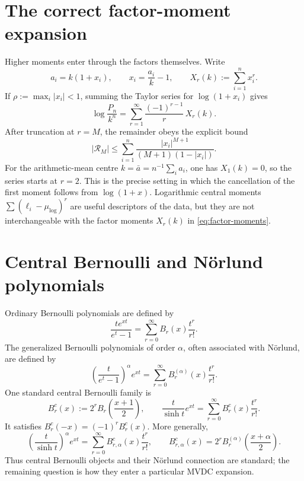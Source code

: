 \documentclass[11pt,a4paper]{article}
\begin{document}
\section{The correct factor-moment expansion}

Higher moments enter through the factors themselves.  Write
\[
  a_i=k(1+x_i),\qquad x_i=\frac{a_i}{k}-1,
  \qquad X_r(k):=\sum_{i=1}^{n}x_i^r .
\]
If \(\rho:=\max_i|x_i|<1\), summing the Taylor series for
\(\log(1+x_i)\) gives
\begin{equation}\label{eq:factor-moments}
  \boxed{\;
  \log\frac{P_n}{k^n}
  =\sum_{r=1}^{\infty}\frac{(-1)^{r-1}}{r}\,X_r(k).\;}
\end{equation}
After truncation at \(r=M\), the remainder obeys the explicit bound
\[
  |\mathcal R_M|
  \le
  \sum_{i=1}^{n}
  \frac{|x_i|^{M+1}}{(M+1)(1-|x_i|)}.
\]
For the arithmetic-mean centre
\(k=\bar a=n^{-1}\sum_i a_i\), one has \(X_1(k)=0\), so the series starts
at \(r=2\).  This is the precise setting in which the cancellation of
the first moment follows from \(\log(1+x)\).  Logarithmic central
moments \(\sum(\ell_i-\mu_{\log})^r\) are useful descriptors of the
data, but they are not interchangeable with the factor moments
\(X_r(k)\) in \eqref{eq:factor-moments}.

\section{Central Bernoulli and Nörlund polynomials}

Ordinary Bernoulli polynomials are defined by
\[
  \frac{t e^{xt}}{e^t-1}
  =\sum_{r=0}^{\infty}B_r(x)\frac{t^r}{r!}.
\]
The generalized Bernoulli polynomials of order \(\alpha\), often
associated with Nörlund, are defined by
\begin{equation}\label{eq:norlund}
  \left(\frac{t}{e^t-1}\right)^\alpha e^{xt}
  =\sum_{r=0}^{\infty}B_r^{(\alpha)}(x)\frac{t^r}{r!}.
\end{equation}
One standard central Bernoulli family is
\begin{equation}\label{eq:central-bernoulli}
  B_r^c(x):=2^rB_r\!\left(\frac{x+1}{2}\right),
  \qquad
  \frac{t}{\sinh t}e^{xt}
  =\sum_{r=0}^{\infty}B_r^c(x)\frac{t^r}{r!}.
\end{equation}
It satisfies \(B_r^c(-x)=(-1)^rB_r^c(x)\).  More generally,
\[
  \left(\frac{t}{\sinh t}\right)^\alpha e^{xt}
  =\sum_{r=0}^{\infty}B_{r,\alpha}^c(x)\frac{t^r}{r!},
  \qquad
  B_{r,\alpha}^c(x)
  =2^rB_r^{(\alpha)}\!\left(\frac{x+\alpha}{2}\right).
\]
Thus central Bernoulli objects and their Nörlund connection are
standard; the remaining question is how they enter a particular MVDC
expansion.
\end{document}
